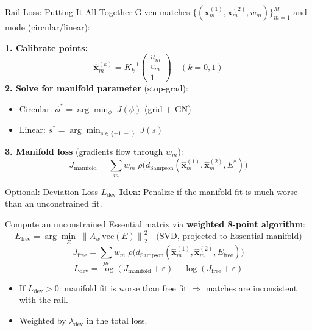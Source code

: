 \documentclass[aspectratio=169, 12pt]{beamer}
\newcommand{\norm}[1]{\left\lVert #1 \right\rVert}
\begin{document}
\begin{frame}{Rail Loss: Putting It All Together}
\small
Given matches $\{(\mathbf{x}^{(1)}_m, \mathbf{x}^{(2)}_m, w_m)\}_{m=1}^M$ and mode (circular/linear):

\smallskip
\textbf{1. Calibrate points:}
\vspace{-0.3em}
\[
    \hat{\mathbf{x}}^{(k)}_m = K_k^{-1} \begin{pmatrix} u_m \\ v_m \\ 1 \end{pmatrix}
    \quad (k = 0, 1)
\]
\vspace{-0.5em}
\textbf{2. Solve for manifold parameter} (stop-grad):
\begin{itemize}\setlength{\itemsep}{1pt}
    \item Circular: $\phi^* = \arg\min_\phi \; J(\phi)$ \quad (grid + GN)
    \item Linear: $s^* = \arg\min_{s \in \{+1,-1\}} \; J(s)$
\end{itemize}

\textbf{3. Manifold loss} (gradients flow through $w_m$):
\vspace{-0.3em}
\[
    \boxed{J_{\mathrm{manifold}} = \sum_{m} w_m \; \rho\!\bigl(d_{\mathrm{Sampson}}(\hat{\mathbf{x}}^{(1)}_m, \hat{\mathbf{x}}^{(2)}_m, E^*)\bigr)}
\]
\end{frame}

\begin{frame}{Optional: Deviation Loss $L_{\mathrm{dev}}$}
\small
\textbf{Idea:} Penalize if the manifold fit is much worse than an unconstrained fit.

\smallskip
Compute an unconstrained Essential matrix via \textbf{weighted 8-point algorithm}:
\vspace{-0.3em}
\[
    E_{\mathrm{free}} = \arg\min_E \; \norm{A_w \, \mathrm{vec}(E)}_2^2
    \quad \text{(SVD, projected to Essential manifold)}
\]
\vspace{-0.8em}
\[
    J_{\mathrm{free}} = \sum_m w_m \; \rho\!\bigl(d_{\mathrm{Sampson}}(\hat{\mathbf{x}}^{(1)}_m, \hat{\mathbf{x}}^{(2)}_m, E_{\mathrm{free}})\bigr)
\]
\vspace{-0.8em}
\[
    \boxed{L_{\mathrm{dev}} = \log(J_{\mathrm{manifold}} + \varepsilon) - \log(J_{\mathrm{free}} + \varepsilon)}
\]
\vspace{-0.3em}
\begin{itemize}\setlength{\itemsep}{2pt}
    \item If $L_{\mathrm{dev}} > 0$: manifold fit is worse than free fit
          $\Rightarrow$ matches are inconsistent with the rail.
    \item Weighted by $\lambda_{\mathrm{dev}}$ in the total loss.
\end{itemize}
\end{frame}
\end{document}

